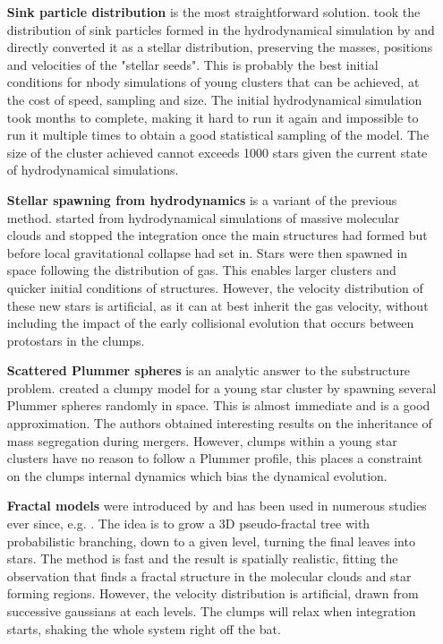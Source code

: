  
\begin{itemize}
\item[\textbf{Sink particle distribution}] is the most straightforward solution. \cite{Moeckel2010} took the distribution of sink particles formed in the hydrodynamical simulation by \cite{Bate2009} and directly converted it as a stellar distribution, preserving the masses, positions and velocities of the "stellar seeds". This is probably the best initial conditions for nbody simulations of young clusters that can be achieved, at the cost of speed, sampling and size. The initial hydrodynamical simulation took months to complete, making it hard to run it again and impossible to run it multiple times to obtain a good statistical sampling of the model. The size of the cluster achieved cannot exceeds 1000 stars given the current state of hydrodynamical simulations.

\item[\textbf{Stellar spawning from hydrodynamics}] is a variant of the previous method. \cite{Fujii2016} started from hydrodynamical simulations of massive molecular clouds and stopped the integration once the main structures had formed but before local gravitational collapse had set in. Stars were then spawned in space following the distribution of gas. This enables larger clusters and quicker initial conditions of structures. However, the velocity distribution of these new stars is artificial, as it can at best inherit the gas velocity, without including the impact of the early collisional evolution that occurs between protostars in the clumps.

\item[\textbf{Scattered Plummer spheres}] is an analytic answer to the substructure problem. \cite{McMillan2007} created a clumpy model for a young star cluster by spawning several Plummer spheres randomly in space. This is almost immediate and is a good approximation. The authors obtained interesting results on the inheritance of mass segregation during mergers. However, clumps within a young star clusters have no reason to follow a Plummer profile, this places a constraint on the clumps internal dynamics which bias the dynamical evolution.

\item[\textbf{Fractal models}] were introduced by \cite{Goodwin2004} and has been used in numerous studies ever since, e.g. \cite{Allison2009b,Kouwenhoven2010,Parker2016}. The idea is to grow a 3D pseudo-fractal tree with probabilistic branching, down to a given level, turning the final leaves into stars. The method is fast and the result is spatially realistic, fitting the observation that finds a fractal structure in the molecular clouds and star forming regions. However, the velocity distribution is artificial, drawn from successive gaussians at each levels. The clumps will relax when integration starts, shaking the whole system right off the bat.

\end{itemize}

